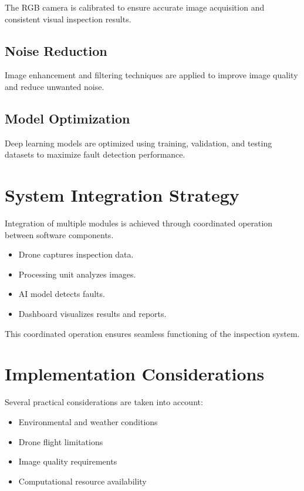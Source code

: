 The RGB camera is calibrated to ensure accurate image acquisition and consistent visual inspection results.

\subsection{Noise Reduction}

Image enhancement and filtering techniques are applied to improve image quality and reduce unwanted noise.

\subsection{Model Optimization}

Deep learning models are optimized using training, validation, and testing datasets to maximize fault detection performance.

\section{System Integration Strategy}

Integration of multiple modules is achieved through coordinated operation between software components.

\begin{itemize}
\item Drone captures inspection data.
\item Processing unit analyzes images.
\item AI model detects faults.
\item Dashboard visualizes results and reports.
\end{itemize}

This coordinated operation ensures seamless functioning of the inspection system.

\section{Implementation Considerations}

Several practical considerations are taken into account:

\begin{itemize}
\item Environmental and weather conditions
\item Drone flight limitations
\item Image quality requirements
\item Computational resource availability
\end{itemize}

